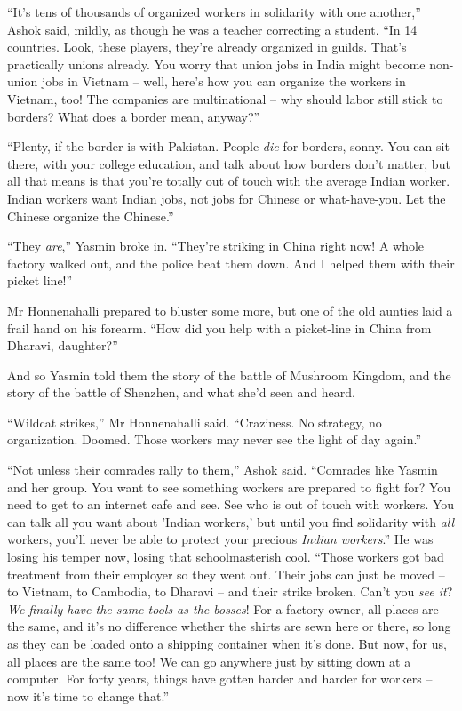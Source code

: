 ``It's tens of thousands of organized workers in solidarity with one
another,'' Ashok said, mildly, as though he was a teacher correcting
a student. ``In 14 countries. Look, these players, they're already
organized in guilds. That's practically unions already. You worry
that union jobs in India might become non-union jobs in Vietnam --
well, here's how you can organize the workers in Vietnam, too! The
companies are multinational -- why should labor still stick to
borders? What does a border mean, anyway?''

``Plenty, if the border is with Pakistan. People \emph{die} for
borders, sonny. You can sit there, with your college education, and
talk about how borders don't matter, but all that means is that
you're totally out of touch with the average Indian worker. Indian
workers want Indian jobs, not jobs for Chinese or what-have-you.
Let the Chinese organize the Chinese.''

``They \emph{are},'' Yasmin broke in. ``They're striking in China
right now! A whole factory walked out, and the police beat them
down. And I helped them with their picket line!''

Mr Honnenahalli prepared to bluster some more, but one of the old
aunties laid a frail hand on his forearm. ``How did you help with a
picket-line in China from Dharavi, daughter?''

And so Yasmin told them the story of the battle of Mushroom
Kingdom, and the story of the battle of Shenzhen, and what she'd
seen and heard.

``Wildcat strikes,'' Mr Honnenahalli said. ``Craziness. No strategy,
no organization. Doomed. Those workers may never see the light of
day again.''

``Not unless their comrades rally to them,'' Ashok said. ``Comrades
like Yasmin and her group. You want to see something workers are
prepared to fight for? You need to get to an internet cafe and see.
See who is out of touch with workers. You can talk all you want
about 'Indian workers,' but until you find solidarity with
\emph{all} workers, you'll never be able to protect your precious
\emph{Indian workers}.'' He was losing his temper now, losing that
schoolmasterish cool. ``Those workers got bad treatment from their
employer so they went out. Their jobs can just be moved -- to
Vietnam, to Cambodia, to Dharavi -- and their strike broken. Can't
you \emph{see it}?
\emph{We finally have the same tools as the bosses}! For a factory
owner, all places are the same, and it's no difference whether the
shirts are sewn here or there, so long as they can be loaded onto a
shipping container when it's done. But now, for us, all places are
the same too! We can go anywhere just by sitting down at a
computer. For forty years, things have gotten harder and harder for
workers -- now it's time to change that.''

